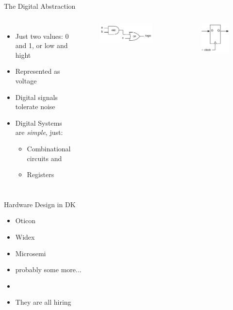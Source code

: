 \documentclass[xcolor=pdflatex,dvipsnames,table]{beamer}
\newcommand{\scale}{0.7}
\begin{document}
\begin{frame}[fragile]{The Digital Abstraction}
\begin{columns}
 
\begin{itemize}
\item Just two values: 0 and 1, or low and hight
\item Represented as voltage
\item Digital signals tolerate noise
\item Digital Systems are \emph{simple}, just:
\begin{itemize}
\item Combinational circuits and
\item Registers
\end{itemize}
\end{itemize}
 
\begin{figure}
  \includegraphics[scale=\scale]{../figures/logic}
\end{figure}
\begin{figure}
  \includegraphics[scale=\scale]{../figures/register}
\end{figure}
\end{columns}

\end{frame}

\begin{frame}[fragile]{Hardware Design in DK}
\begin{itemize}
\item Oticon
\item Widex
\item Microsemi
\item probably some more...
\item 
\item They are all hiring
\end{itemize}
\end{frame}
\end{document}
